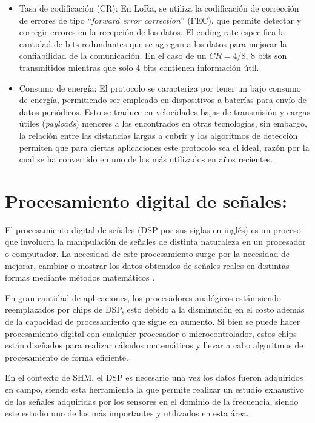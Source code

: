 \begin{itemize}
    \item Tasa de codificación (CR): En LoRa, se utiliza la codificación de corrección de errores de tipo ``\textit{forward error correction}'' (FEC), que permite detectar y corregir errores en la recepción de los datos. El coding rate especifica la cantidad de bits redundantes que se agregan a los datos para mejorar la confiabilidad de la comunicación. En el caso de un $CR = 4 / 8$, 8 bits son transmitidos mientras que solo 4 bits contienen información útil.
    
    
    \item Consumo de energía: El protocolo se caracteriza por tener un bajo consumo de energía, permitiendo ser empleado en dispositivos a baterías para envío de datos periódicos. Esto se traduce en velocidades bajas de transmisión y cargas útiles (\textit{payloads}) menores a los encontrados en otras tecnologías, sin embargo, la relación entre las distancias largas a cubrir y los algoritmos de detección permiten que para ciertas aplicaciones este protocolo sea el ideal, razón por la cual se ha convertido en uno de los más utilizados en años recientes.
\end{itemize}

\section{Procesamiento digital de señales:}

El procesamiento digital de señales (DSP por sus siglas en inglés) es un proceso que involucra la manipulación de señales de distinta naturaleza en un procesador o computador. La necesidad de este procesamiento surge por la necesidad de mejorar, cambiar o mostrar los datos obtenidos de señales reales en distintas formas mediante métodos matemáticos \citep{proakisDSP}.

En gran cantidad de aplicaciones, los procesadores analógicos están siendo reemplazados por chips de DSP, esto debido a la disminución en el costo además de la capacidad de procesamiento que sigue en aumento. Si bien se puede hacer procesamiento digital con cualquier procesador o microcontrolador, estos chips están diseñados para realizar cálculos matemáticos y llevar a cabo algoritmos de procesamiento de forma eficiente. 

En el contexto de SHM, el DSP es necesario una vez los datos fueron adquiridos en campo, siendo esta herramienta la que permite realizar un estudio exhaustivo de las señales adquiridas por los sensores en el dominio de la frecuencia, siendo este estudio uno de los más importantes y utilizados en esta área.

